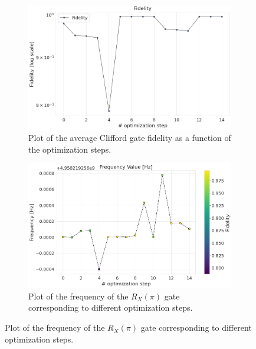\begin{figure}[h]
    \centering
    \begin{subfigure}[t]{0.495\textwidth}
        \includegraphics[width=\textwidth]{figures/png/RB_optimization/SLSQP/fidelity.png}
        \caption{Plot of the average Clifford gate fidelity as a function of the optimization steps.}
        \label{fig:SLSQP:fidelity}
    \end{subfigure}
    \hfill
    \begin{subfigure}[t]{0.495\textwidth}
        \includegraphics[width=\textwidth]{figures/png/RB_optimization/SLSQP/frequency.png}
        \caption{Plot of the frequency of the $R_X(\pi)$ gate corresponding to different optimization steps.}
        \label{fig:SLSQP:frequency}
    \end{subfigure}

    \vspace{0.5cm}


\end{figure}
